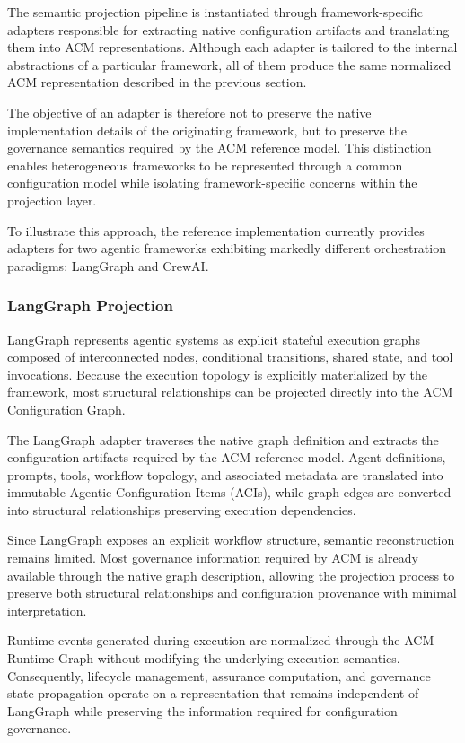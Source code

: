\documentclass[10pt]{article}
\begin{document}
The semantic projection pipeline is instantiated through framework-specific adapters responsible for extracting native configuration artifacts and translating them into ACM representations. Although each adapter is tailored to the internal abstractions of a particular framework, all of them produce the same normalized ACM representation described in the previous section.

The objective of an adapter is therefore not to preserve the native implementation details of the originating framework, but to preserve the governance semantics required by the ACM reference model. This distinction enables heterogeneous frameworks to be represented through a common configuration model while isolating framework-specific concerns within the projection layer.

To illustrate this approach, the reference implementation currently provides adapters for two agentic frameworks exhibiting markedly different orchestration paradigms: LangGraph and CrewAI.

\subsubsection{LangGraph Projection}

LangGraph represents agentic systems as explicit stateful execution graphs composed of interconnected nodes, conditional transitions, shared state, and tool invocations. Because the execution topology is explicitly materialized by the framework, most structural relationships can be projected directly into the ACM Configuration Graph.

The LangGraph adapter traverses the native graph definition and extracts the configuration artifacts required by the ACM reference model. Agent definitions, prompts, tools, workflow topology, and associated metadata are translated into immutable Agentic Configuration Items (ACIs), while graph edges are converted into structural relationships preserving execution dependencies.

Since LangGraph exposes an explicit workflow structure, semantic reconstruction remains limited. Most governance information required by ACM is already available through the native graph description, allowing the projection process to preserve both structural relationships and configuration provenance with minimal interpretation.

Runtime events generated during execution are normalized through the ACM Runtime Graph without modifying the underlying execution semantics. Consequently, lifecycle management, assurance computation, and governance state propagation operate on a representation that remains independent of LangGraph while preserving the information required for configuration governance.
\end{document}
